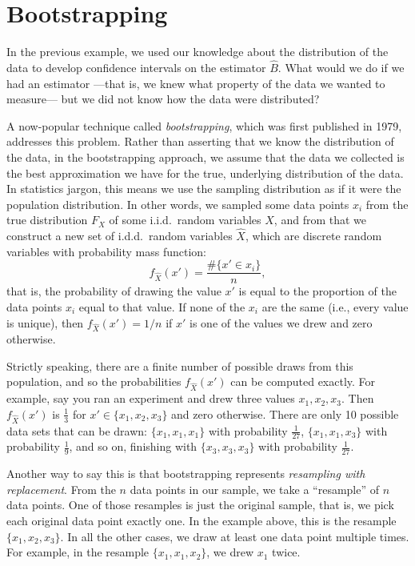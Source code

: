 \section{Bootstrapping}

In the previous example, we used our knowledge about the distribution of the data to develop confidence intervals on the estimator $\hat{B}$. What would we do if we had an estimator ---that is, we knew what property of the data we wanted to measure--- but we did not know how the data were distributed?

A now-popular technique called \emph{bootstrapping}, which was first published in 1979, addresses this problem. Rather than asserting that we know the distribution of the data, in the bootstrapping approach, we assume that the data we collected is the best approximation we have for the true, underlying distribution of the data. In statistics jargon, this means we use the sampling distribution as if it were the population distribution. In other words, we sampled some data points $x_i$ from the true distribution $F_X$ of some i.i.d.~random variables $X$, and from that we construct a new set of i.d.d.~random variables $\hat{X}$, which are discrete random variables with probability mass function:
\begin{equation*}
    f_{\hat{X}}(x') = \frac{\#\{x' \in x_i\}}{n},
\end{equation*}
that is, the probability of drawing the value $x'$ is equal to the proportion of the data points $x_i$ equal to that value. If none of the $x_i$ are the same (i.e., every value is unique), then $f_{\hat{X}}(x') = 1/n$ if $x'$ is one of the values we drew and zero otherwise.

Strictly speaking, there are a finite number of possible draws from this population, and so the probabilities $f_{\hat{X}}(x')$ can be computed exactly. For example, say you ran an experiment and drew three values $x_1, x_2, x_3$. Then $f_{\hat{X}}(x')$ is $\tfrac{1}{3}$ for $x' \in \{x_1,x_2,x_3\}$ and zero otherwise. There are only 10 possible data sets that can be drawn: $\{x_1,x_1,x_1\}$ with probability $\tfrac{1}{27}$, $\{x_1,x_1,x_3\}$ with probability $\tfrac{1}{9}$, and so on, finishing with $\{x_3,x_3,x_3\}$ with probability $\tfrac{1}{27}$.

Another way to say this is that bootstrapping represents \emph{resampling with replacement}. From the $n$ data points in our sample, we take a ``resample'' of $n$ data points. One of those resamples is just the original sample, that is, we pick each original data point exactly one. In the example above, this is the resample $\{x_1,x_2,x_3\}$. In all the other cases, we draw at least one data point multiple times. For example, in the resample $\{x_1,x_1,x_2\}$, we drew $x_1$ twice.

